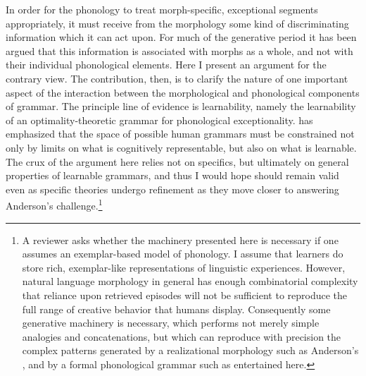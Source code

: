 \documentclass[output=paper,
modfonts
]{LSP/langsci}
\begin{document}
\noindent In order for the phonology to treat morph-specific, exceptional segments appropriately, it must receive from the morphology some kind of discriminating information which it can act upon. For much of the generative period it has been argued that this information is associated with morphs as a whole, and not with their individual phonological elements. Here I present an argument for the contrary view. The contribution, then, is to clarify the nature of one important aspect of the interaction between the morphological and phonological components of grammar. The principle line of evidence is learnability, namely the learnability of an optimality-theoretic grammar for phonological exceptionality. \citet{anderson2008} has emphasized that the space of possible human grammars must be constrained not only by limits on what is cognitively representable, but also on what is learnable. The crux of the argument here relies not on specifics, but ultimately on general properties of learnable grammars, and thus I would hope should remain valid even as specific theories undergo refinement as they move closer to answering Anderson's \citeyearpar{anderson2008} challenge.\footnote{A reviewer asks whether the machinery presented here is necessary if one assumes an exemplar-based model of phonology. I assume that learners do store rich, exemplar-like representations of linguistic experiences. However, natural language morphology in general has enough combinatorial complexity that reliance upon retrieved episodes will not be sufficient to reproduce the full range of creative behavior that humans display. Consequently some generative machinery is necessary, which performs not merely simple analogies and concatenations, but which can reproduce with precision the complex patterns generated by a realizational morphology such as Anderson's \citeyearpar{anderson1992}, and by a formal phonological grammar such as entertained here.}
\end{document}
